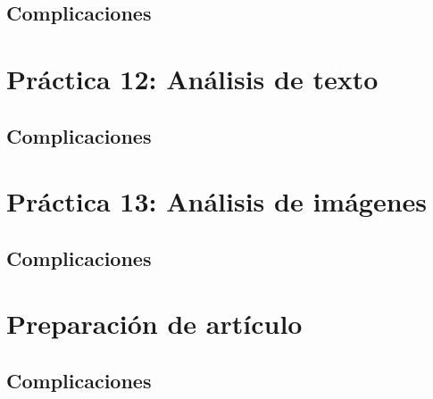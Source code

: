 \documentclass[12pt, letter]{report}
\begin{document}
\section*{Complicaciones}



\chapter*{Práctica 12: Análisis de texto}
\section*{Complicaciones}



\chapter*{Práctica 13: Análisis de imágenes}
\section*{Complicaciones}



\chapter*{Preparación de artículo}
\section*{Complicaciones}


\end{document}
